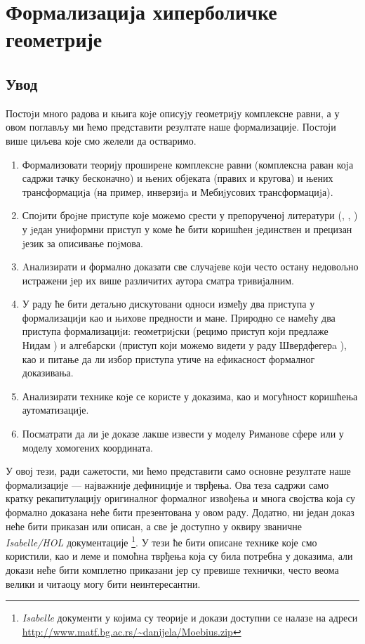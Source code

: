 \chapter{Формализација хиперболичке геометрије}
\label{chapter::hiperbolicka}

\section{Увод}

Постоjи много радова и књига коjе описуjу геометриjу комплексне равни,
а у овом поглављу ми ћемо представити резултате наше
формализације. Постоји више циљева које смо желели да остваримо.

\begin{enumerate}
\item Формализовати теорију проширене комплексне равни (комплексна
  раван коjа садржи тачку бесконачно) и њених објеката (правих и
  кругова) и њених трансформациjа (на пример, инверзијa и Мебиjусових
  трансформациjа).
\item Споjити броjне приступе које можемо срести у препорученој
  литератури (\cite{needham}, \cite{schwerdtfeger},
  \cite{mateljevic2006kompleksne}) у jедан униформни приступ у коме ће
  бити коришћен jединствен и прецизан jезик за описивање поjмова.
\item Aнализирати и формално доказати све случаjеве коjи често остану
  недовољно истражени jер их више различитих аутора сматра тривиjалним.
\item У раду ће бити детаљно дискутовани односи између два приступа у
  формализациjи као и њихове предности и мане. Природно се намећу два
  приступа формализациjи: геометриjски (рецимо приступ који предлаже
  Нидам \cite{needham}) и алгебарски (приступ који можемо видети у
  раду Швердфегерa \cite{schwerdtfeger}), као и питање да ли избор
  приступа утиче на ефикасност формалног доказивања.
\item Анализирати технике коjе се користе у доказима, као и могућност
  коришћења аутоматизациjе.
\item Посматрати да ли jе доказе лакше извести у моделу Риманове сфере
  или у моделу хомогених координата.
\end{enumerate}

У овој тези, ради сажетости, ми ћемо представити само основне
резултате наше формализације --- најважније дефиниције и тврђења. Ова
теза садржи само кратку рекапитулацију оригиналног формалног извођења и
многа својства која су формално доказана неће бити презентована у овом
раду. Додатно, ни један доказ неће бити приказан или описан, а све је
доступно у оквиру званичне \emph{Isabelle/HOL}
документације \footnote{\emph{Isabelle} документи у којима су теорије и
  докази доступни се налазе на адреси
  \url{http://www.matf.bg.ac.rs/~danijela/Moebius.zip}}. У тези ће
бити описане технике које смо користили, као и леме и помоћна тврђења
која су била потребна у доказима, али докази неће бити комплетно
приказани јер су превише технички, често веома велики и читаоцу могу
бити неинтересантни.

